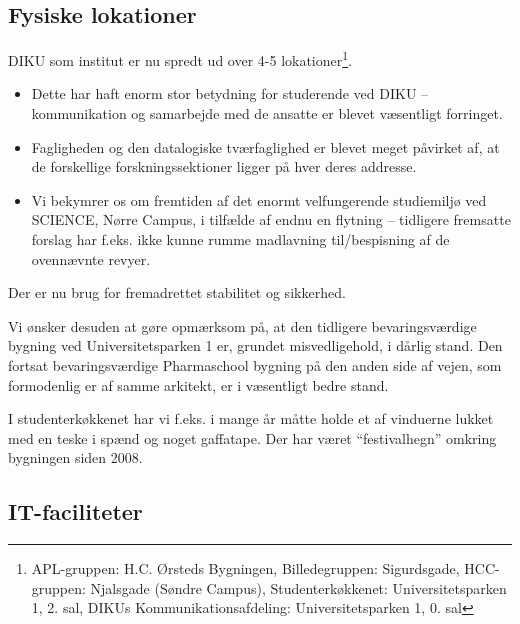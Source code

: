 \documentclass{article}
\begin{document}
\subsection{Fysiske lokationer}

DIKU som institut er nu spredt ud over 4-5 lokationer\footnote{APL-gruppen: H.C. Ørsteds Bygningen, Billedegruppen:
Sigurdsgade, HCC-gruppen: Njalsgade (Søndre Campus), Studenterkøkkenet:
Universitetsparken 1, 2. sal, DIKUs Kommunikationsafdeling: Universitetsparken
1, 0. sal}.
\begin{itemize}
\itemsep0em 
\item Dette har haft enorm stor betydning for studerende ved DIKU -- 
kommunikation og samarbejde med de ansatte er blevet væsentligt forringet.
\item Fagligheden og den datalogiske tværfaglighed er blevet meget påvirket af,
at de forskellige forskningssektioner ligger på hver deres addresse.
\item Vi bekymrer os om fremtiden af det enormt velfungerende studiemiljø ved
SCIENCE, Nørre Campus, i tilfælde af endnu en flytning -- tidligere fremsatte
forslag har f.eks. ikke kunne rumme madlavning til/bespisning af de ovennævnte
revyer.
\end{itemize}
Der er nu brug for fremadrettet stabilitet og sikkerhed.

Vi ønsker desuden at gøre opmærksom på, at den tidligere bevaringsværdige
bygning ved Universitetsparken 1 er, grundet misvedligehold, i dårlig stand.
Den fortsat bevaringsværdige Pharmaschool bygning på den anden side af vejen,
som formodenlig er af samme arkitekt, er i væsentligt bedre stand.

I studenterkøkkenet har vi f.eks. i mange år måtte holde et af vinduerne lukket
med en teske i spænd og noget gaffatape. Der har været ``festivalhegn'' omkring
bygningen siden 2008.

\subsection{IT-faciliteter}
\end{document}
